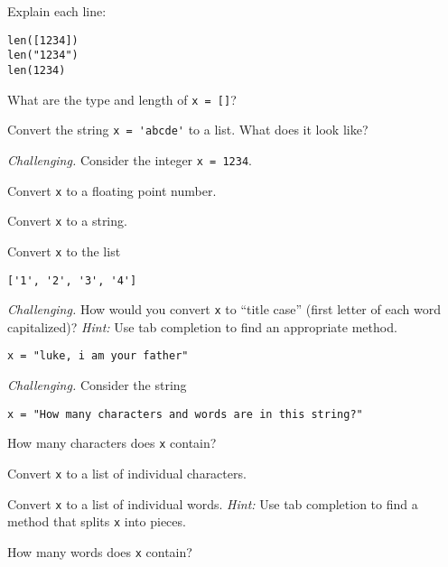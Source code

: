 \documentclass[11pt]{exam}
\begin{document}
\begin{questions}
\item Explain each line:
\begin{verbatim}
len([1234])
len("1234")
len(1234)
\end{verbatim}

\item What are the type and length of \texttt{x = []}?


\item Convert the string \verb|x = 'abcde'| to a list.  What does it look like?

\item {\it Challenging.\/}
Consider the integer \texttt{x = 1234}.
\begin{parts}
\item Convert \texttt{x} to a floating point number.
\item Convert \texttt{x} to a string.
\item Convert \texttt{x} to the list
\begin{verbatim}
['1', '2', '3', '4']
\end{verbatim}

\end{parts}

\item {\it Challenging.\/}
How would you convert \texttt{x} to ``title case'' (first letter of each word capitalized)?
{\it Hint:\/} Use tab completion to find an appropriate method.
\begin{verbatim}
x = "luke, i am your father"
\end{verbatim}

\item {\it Challenging.\/} Consider the string
\begin{verbatim}
x = "How many characters and words are in this string?"
\end{verbatim}
\begin{parts}
\item How many characters does \texttt{x} contain?
\item Convert \texttt{x} to a list of individual characters.
\item Convert \texttt{x} to a list of individual words.
{\it Hint:\/}  Use tab completion to find a method that splits \texttt{x}
into pieces.
\item How many words does \texttt{x} contain?
\end{parts}





\end{questions}
\end{document}
